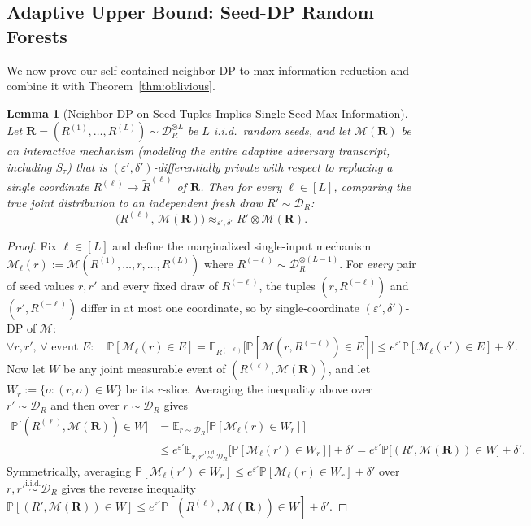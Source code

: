 \documentclass[11pt]{article}
\newtheorem{lemma}{Lemma}
\theoremstyle{definition}
\newcommand{\E}{\mathbb{E}}
\newcommand{\Prob}{\mathbb{P}}
\newcommand{\calD}{\mathcal{D}}
\newcommand{\calM}{\mathcal{M}}
\begin{document}
\subsection{Adaptive Upper Bound: Seed-DP Random Forests}

We now prove our self-contained neighbor-DP-to-max-information reduction and combine it with Theorem~\ref{thm:oblivious}.

\begin{lemma}[Neighbor-DP on Seed Tuples Implies Single-Seed Max-Information]
\label{lem:maxinfo}
Let $\mathbf{R} = (R^{(1)}, \dots, R^{(L)}) \sim \calD_R^{\otimes L}$ be $L$ i.i.d.\ random seeds, and let $\calM(\mathbf{R})$ be an interactive mechanism (modeling the entire adaptive adversary transcript, including $S_\tau$) that is $(\varepsilon', \delta')$-differentially private with respect to replacing a \emph{single} coordinate $R^{(\ell)} \to \tilde{R}^{(\ell)}$ of $\mathbf{R}$. Then for \emph{every} $\ell \in [L]$, comparing the true joint distribution to an independent fresh draw $R' \sim \calD_R$:
\[
    \big(R^{(\ell)}, \, \calM(\mathbf{R})\big) \approx_{\varepsilon', \delta'} R' \otimes \calM(\mathbf{R}).
\]
\end{lemma}

\begin{proof}
Fix $\ell \in [L]$ and define the marginalized single-input mechanism $\calM_\ell(r) := \calM(R^{(1)}, \dots, r, \dots, R^{(L)})$ where $R^{(-\ell)} \sim \calD_R^{\otimes (L-1)}$. For \emph{every} pair of seed values $r, r'$ and every fixed draw of $R^{(-\ell)}$, the tuples $(r, R^{(-\ell)})$ and $(r', R^{(-\ell)})$ differ in at most one coordinate, so by single-coordinate $(\varepsilon', \delta')$-DP of $\calM$:
\[
    \forall r, r', \, \forall \text{ event } E: \quad \Prob[\calM_\ell(r) \in E] = \E_{R^{(-\ell)}}\big[\Prob[\calM(r, R^{(-\ell)}) \in E]\big] \le e^{\varepsilon'} \Prob[\calM_\ell(r') \in E] + \delta'.
\]
Now let $W$ be any joint measurable event of $(R^{(\ell)}, \calM(\mathbf{R}))$, and let $W_r := \{o : (r, o) \in W\}$ be its $r$-slice. Averaging the inequality above over $r' \sim \calD_R$ and then over $r \sim \calD_R$ gives
\begin{align*}
    \Prob\big[(R^{(\ell)}, \calM(\mathbf{R})) \in W\big] &= \E_{r \sim \calD_R}\big[\Prob[\calM_\ell(r) \in W_r]\big] \\
    &\le e^{\varepsilon'} \E_{r, r' \stackrel{\text{i.i.d.}}{\sim} \calD_R}\big[\Prob[\calM_\ell(r') \in W_r]\big] + \delta' = e^{\varepsilon'} \Prob\big[(R', \calM(\mathbf{R})) \in W\big] + \delta'.
\end{align*}
Symmetrically, averaging $\Prob[\calM_\ell(r') \in W_r] \le e^{\varepsilon'} \Prob[\calM_\ell(r) \in W_r] + \delta'$ over $r, r' \stackrel{\text{i.i.d.}}{\sim} \calD_R$ gives the reverse inequality $\Prob[(R', \calM(\mathbf{R})) \in W] \le e^{\varepsilon'}\Prob[(R^{(\ell)}, \calM(\mathbf{R})) \in W] + \delta'$.
\end{proof}
\end{document}
